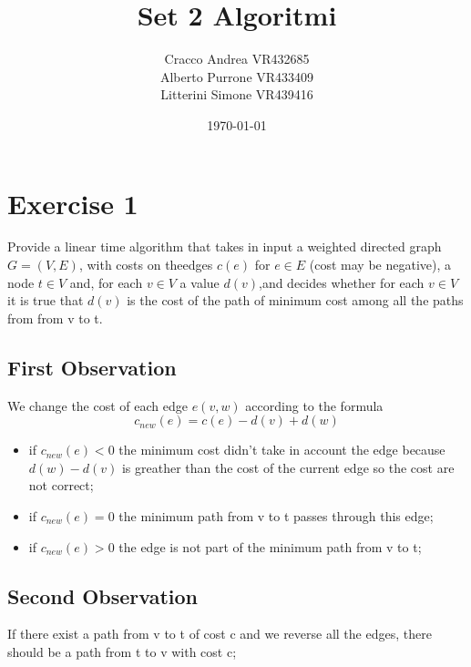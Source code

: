 \documentclass[]{article}
\begin{document}
\title{Set 2 Algoritmi}
\author{Cracco Andrea VR432685\\Alberto Purrone VR433409\\Litterini Simone VR439416\\}
\date{\today}
\maketitle




\section{Exercise 1}

Provide a linear time algorithm that takes in input a weighted directed graph $G = (V, E)$, with costs on theedges $c(e)$ for $e∈E$ (cost may be negative), a node $t∈V$ and, for each $v∈V$ a value $d(v)$,and decides whether for each $v ∈ V$ it is true that $d(v)$ is the cost of the path of minimum cost among all the paths from from v to t.

\subsection{First Observation}

We change the cost of each edge $e(v,w)$ according to the formula $$ c_{new}(e) = c(e)-d(v)+d(w)$$

\begin{itemize}

\item if $c_{new}(e)  < 0$ the minimum cost didn't take in account the edge because $d(w) - d(v)$ is greather than the cost of the current edge so the cost are not correct;

\item if $c_{new}(e)  = 0$ the minimum path from v to t passes through this edge;

\item if $c_{new}(e)  > 0$ the edge is not part of the minimum path from v to t;


\end{itemize}

\subsection{Second Observation}

If there exist a path from v to t of cost c and we reverse all the edges, there should be a path from t to v with cost c;
\end{document}
